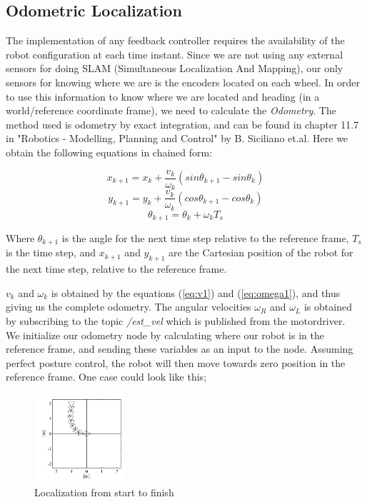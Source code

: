 \documentclass[a4paper,10pt]{article}
\begin{document}
\subsection{Odometric Localization}

	The implementation of any feedback controller requires the availability of the robot configuration at each time instant. 
	Since we are not using any external sensors for doing SLAM
	(Simultaneous Localization And Mapping), our only sensors for knowing where we are is the encoders located on each wheel. 
	In order to use this information to know where we are located and heading (in a world/reference coordinate frame), 
	we need to calculate the \emph{Odometry}. The method used is odometry by exact integration, and can be found in chapter 11.7 in
	"Robotics - Modelling, Planning and Control" by B. Siciliano et.al. Here we obtain the following equations in chained form:
	
		\begin{equation}
		x_{k+1}=x_k+\frac{v_k}{\omega_k}(sin\theta_{k+1}-sin\theta_k)
		\end{equation}
		\begin{equation}
		y_{k+1}=y_k+\frac{v_k}{\omega_k}(cos\theta_{k+1}-cos\theta_k)
		\end{equation}
		\begin{equation}
		\theta_{k+1}=\theta_k+\omega_kT_s
		\end{equation}
		
		Where $\theta_{k+1}$ is the angle for the next time step relative to the reference frame, $T_s$ is the time step, 
		and $x_{k+1}$ and $y_{k+1}$ are the Cartesian position of the robot for the next time step, relative to the reference frame.

		$v_k$ and $\omega_k$ is obtained by the equations (\ref{eq:v1}) and (\ref{eq:omega1}), and thus giving us the complete odometry. 
		The angular velocities $\omega_R$  and $\omega_L$ is obtained by subscribing to
		the topic \textit{/est\_vel} which is published from the motordriver.\\

		We initialize our odometry node by calculating where our robot is in the reference frame, 
		and sending these variables as an input to the node. Assuming perfect posture control, the robot will
		then move towards zero position in the reference frame. One case could look like this;


		\begin{figure}[H]
		\centering
		\includegraphics[width=0.3\textwidth]{odometric_localization_config.JPG}
		\caption{Localization from start to finish}	
 		\label{fig:odometriclocalization}
		\end{figure}
\end{document}
